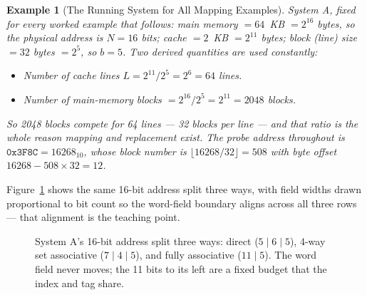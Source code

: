 \documentclass[11pt]{article}
\newtheorem{example}{Example}[section]
\begin{document}
\begin{example}[The Running System for All Mapping Examples]
\label{ex:system-a}
System A, fixed for every worked example that follows: main memory $=64$~KB $= 2^{16}$ bytes, so the physical address is $N = 16$ bits; cache $= 2$~KB $= 2^{11}$ bytes; block (line) size $= 32$ bytes $= 2^5$, so $b = 5$. Two derived quantities are used constantly:

\begin{itemize}
  \item Number of cache lines $L = 2^{11} / 2^{5} = 2^{6} = 64$ lines.
  \item Number of main-memory blocks $= 2^{16} / 2^{5} = 2^{11} = 2048$ blocks.
\end{itemize}

So 2048 blocks compete for 64 lines --- 32 blocks per line --- and that ratio is the whole reason mapping and replacement exist. The probe address throughout is $\texttt{0x3F8C} = 16268_{10}$, whose block number is $\lfloor 16268/32 \rfloor = 508$ with byte offset $16268 - 508\times 32 = 12$.
\end{example}

Figure~\ref{fig:three-schemes} shows the same 16-bit address split three ways, with field widths drawn proportional to bit count so the word-field boundary aligns across all three rows --- that alignment is the teaching point.

\begin{figure}[h]
  \centering
  \caption{System A's 16-bit address split three ways: direct ($5\mid6\mid5$), 4-way set associative ($7\mid4\mid5$), and fully associative ($11\mid5$). The word field never moves; the 11 bits to its left are a fixed budget that the index and tag share.}
  \label{fig:three-schemes}
\end{figure}
\end{document}
